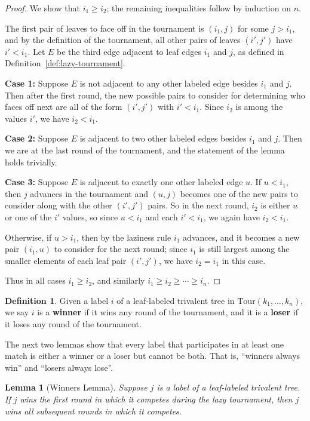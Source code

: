 \documentclass[11pt]{amsart}
\newcommand{\Tour}{\mathrm{Tour}}
\newtheorem{lemma}[thm]{Lemma}
\numberwithin{thm}{section}
\numberwithin{equation}{section}
\numberwithin{figure}{section}
\theoremstyle{definition}
\newtheorem{definition}[thm]{Definition}
\begin{document}
\begin{proof}
  We show that $i_1\ge i_2$; the remaining inequalities follow by induction on $n$.
  
  The first pair of leaves to face off in the tournament is $(i_1,j)$ for some $j>i_1$, and by the definition of the tournament, all other pairs of leaves $(i',j')$ have $i'<i_1$.  Let $E$ be the third edge adjacent to leaf edges $i_1$ and $j$, as defined in Definition~\ref{def:lazy-tournament}.
  
  \textbf{Case 1:} Suppose $E$ is not adjacent to any other labeled edge besides $i_1$ and $j$.  Then after the first round, the new possible pairs to consider for determining who faces off next are all of the form $(i',j')$ with $i'<i_1$.  Since $i_2$ is among the values $i'$, we have $i_2<i_1$.
  
  \textbf{Case 2:} Suppose $E$ is adjacent to two other labeled edges besides $i_1$ and $j$. Then we are at the last round of the tournament, and the statement of the lemma holds trivially.
  
  \textbf{Case 3:} Suppose $E$ is adjacent to exactly one other labeled edge $u$.  If $u<i_1$, then $j$ advances in the tournament and $(u,j)$ becomes one of the new pairs to consider along with the other $(i',j')$ pairs.  So in the next round, $i_2$ is either $u$ or one of the $i'$ values, so since $u<i_1$ and each $i'<i_1$, we again have $i_2<i_1$.

  Otherwise, if $u>i_1$, then by the laziness rule $i_1$ advances, and it becomes a new pair $(i_1,u)$ to consider for the next round; since $i_1$ is still largest among the smaller elements of each leaf pair $(i',j')$, we have $i_2=i_1$ in this case.
  
  Thus in all cases $i_1\ge i_2$, and similarly $i_1\ge i_2 \ge \cdots \ge i_n$.
\end{proof}

\begin{definition}
Given a label $i$ of a leaf-labeled trivalent tree in $\Tour(k_1,\dots,k_n)$, we say $i$ is a \textbf{winner} if it wins any round of the tournament, and it is a \textbf{loser} if it loses any round of the tournament. 
\end{definition}

The next two lemmas show that every label that participates in at least one match is either a winner or a loser but cannot be both. That is, ``winners always win'' and ``losers always lose''.

\begin{lemma}[Winners Lemma]\label{lem:winners-win}
Suppose $j$ is a label of a leaf-labeled trivalent  tree. If $j$ wins the first round in which it competes during the lazy tournament, then $j$ wins all subsequent rounds in which it competes.
\end{lemma}
\end{document}
